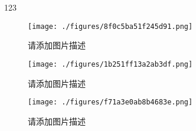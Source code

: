 
123

\begin{figure}[ht]
\centering
\texttt{[image: ./figures/8f0c5ba51f245d91.png]}
\caption{请添加图片描述} \label{fig_testcs_1}
\end{figure}

\begin{figure}[ht]
\centering
\texttt{[image: ./figures/1b251ff13a2ab3df.png]}
\caption{请添加图片描述} \label{fig_testcs_2}
\end{figure}

\begin{figure}[ht]
\centering
\texttt{[image: ./figures/f71a3e0ab8b4683e.png]}
\caption{请添加图片描述} \label{fig_testcs_3}
\end{figure}
